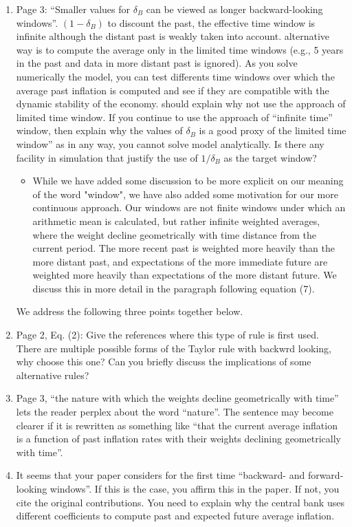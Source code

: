 \documentclass[english,authoryear,12pt]{elsarticle}
\begin{document}
\begin{enumerate}
\begin{itemize}
	\end{itemize}
	\item Page 3: ``Smaller values for $\delta_B$ can be viewed as longer backward-looking windows”. $\left(1-\delta_B\right)$ to discount the past, the effective time window is infinite although the distant past is weakly taken into account.  alternative way is to compute the average only in the limited time windows (e.g., 5 years in the past and data in more distant past is ignored). As you solve numerically the model, you can test differents time windows over which the average past inflation is computed and see if they are compatible with the dynamic stability of the economy. should explain why not use the approach of limited time window. If you continue to use the approach of “infinite time” window, then explain why the values of $\delta_B$ is a good proxy of the limited time window” as in any way, you cannot solve model analytically. Is there any facility in simulation that justify the use of $1/ \delta_B$ as the target window?
	\begin{itemize}
		\item While we have added some discussion to be more explicit on our meaning of the word "window", we have also added some motivation for our more continuous approach. Our windows are not finite windows under which an arithmetic mean is calculated, but rather infinite weighted averages, where the weight decline geometrically with time distance from the current period. The more recent past is weighted more heavily than the more distant past, and expectations of the more immediate future are weighted more heavily than expectations of the more distant future. We discuss this in more detail in the paragraph following equation (7). 
	\end{itemize}
	We address the following three points together below.
	\item Page 2, Eq. (2): Give the references where this type of rule is first used. There are multiple possible forms of the Taylor rule with backwrd looking, why choose this one? Can you briefly discuss the implications of some alternative rules?
	\item Page 3, “the nature with which the weights decline geometrically with time” lets the reader perplex about the word “nature”. The sentence may become clearer if it is rewritten as something like “that the current average inflation is a function of past inflation rates with their weights declining geometrically with time”.
	\item It seems that your paper considers for the first time “backward- and forward-looking windows”. If this is the case, you affirm this in the paper. If not, you cite the original contributions. You need to explain why the central bank uses different coefficients to compute past and expected future average inflation.

\end{enumerate}
\end{document}
